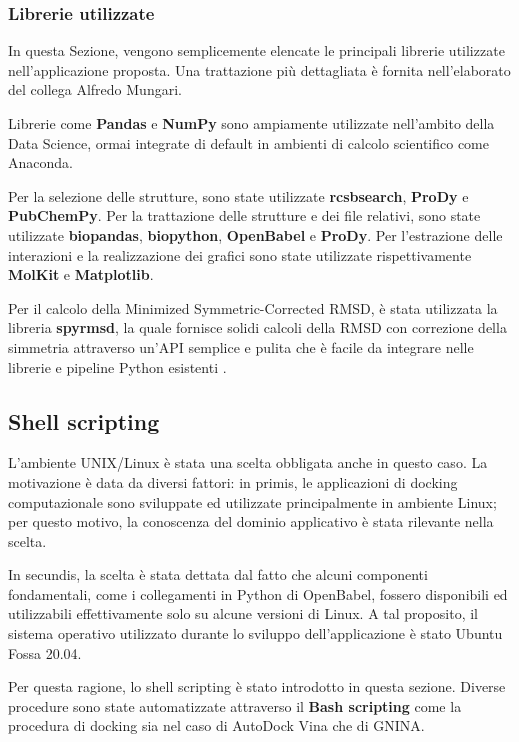 \subsubsection{Librerie utilizzate}
In questa Sezione, vengono semplicemente elencate le principali librerie utilizzate nell'applicazione proposta. Una trattazione più dettagliata è fornita nell'elaborato del collega Alfredo Mungari.

Librerie come \textbf{Pandas} e \textbf{NumPy} sono ampiamente utilizzate nell'ambito della Data Science, ormai integrate di default in ambienti di calcolo scientifico come Anaconda.

Per la selezione delle strutture, sono state utilizzate \textbf{rcsbsearch}, \textbf{ProDy} e \textbf{PubChemPy}.
Per la trattazione delle strutture e dei file relativi, sono state utilizzate \textbf{biopandas}, \textbf{biopython}, \textbf{OpenBabel} e \textbf{ProDy}.
Per l'estrazione delle interazioni e la realizzazione dei grafici sono state utilizzate rispettivamente \textbf{MolKit} e \textbf{Matplotlib}.

Per il calcolo della Minimized Symmetric-Corrected RMSD, è stata utilizzata la libreria \textbf{spyrmsd}, la quale fornisce solidi calcoli della RMSD con correzione della simmetria attraverso un'API semplice e pulita che è facile da integrare nelle librerie e pipeline Python esistenti \cite{meli_spyrmsd_2020}.


\subsection{Shell scripting}
L'ambiente UNIX/Linux è stata una scelta obbligata anche in questo caso. La motivazione è data da diversi fattori: in primis, le applicazioni di docking computazionale sono sviluppate ed utilizzate principalmente in ambiente Linux; per questo motivo, la conoscenza del dominio applicativo è stata rilevante nella scelta. 

In secundis, la scelta è stata dettata dal fatto che alcuni componenti fondamentali, come i collegamenti in Python di OpenBabel, fossero disponibili ed utilizzabili effettivamente solo su alcune versioni di Linux. A tal proposito, il sistema operativo utilizzato 
durante lo sviluppo dell'applicazione è stato Ubuntu Fossa 20.04.

Per questa ragione, lo shell scripting è stato introdotto in questa sezione. Diverse procedure sono state automatizzate attraverso il \textbf{Bash scripting} come la procedura di docking sia nel caso di AutoDock Vina che di GNINA.


